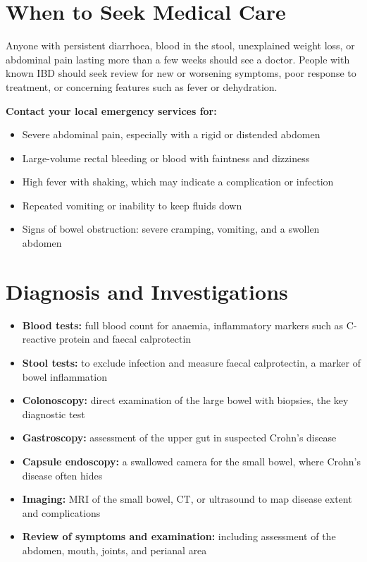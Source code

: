 \section*{When to Seek Medical Care}
Anyone with persistent diarrhoea, blood in the stool, unexplained weight loss, or abdominal pain lasting more than a few weeks should see a doctor. People with known IBD should seek review for new or worsening symptoms, poor response to treatment, or concerning features such as fever or dehydration.

\textbf{Contact your local emergency services for:}
\begin{itemize}
    \item Severe abdominal pain, especially with a rigid or distended abdomen
    \item Large-volume rectal bleeding or blood with faintness and dizziness
    \item High fever with shaking, which may indicate a complication or infection
    \item Repeated vomiting or inability to keep fluids down
    \item Signs of bowel obstruction: severe cramping, vomiting, and a swollen abdomen
\end{itemize}

\section*{Diagnosis and Investigations}
\begin{itemize}
    \item \textbf{Blood tests:} full blood count for anaemia, inflammatory markers such as C-reactive protein and faecal calprotectin
    \item \textbf{Stool tests:} to exclude infection and measure faecal calprotectin, a marker of bowel inflammation
    \item \textbf{Colonoscopy:} direct examination of the large bowel with biopsies, the key diagnostic test
    \item \textbf{Gastroscopy:} assessment of the upper gut in suspected Crohn's disease
    \item \textbf{Capsule endoscopy:} a swallowed camera for the small bowel, where Crohn's disease often hides
    \item \textbf{Imaging:} MRI of the small bowel, CT, or ultrasound to map disease extent and complications
    \item \textbf{Review of symptoms and examination:} including assessment of the abdomen, mouth, joints, and perianal area
\end{itemize}


